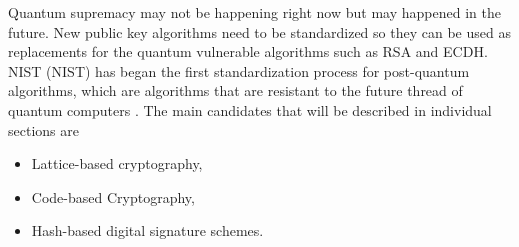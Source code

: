 Quantum supremacy may not be happening right now but may happened in the future. New public key algorithms need to be standardized so they can be used as replacements for the quantum vulnerable algorithms such as RSA and ECDH. NIST (\acl{NIST}) has began the first standardization process for post-quantum algorithms, which are algorithms that are resistant to the future thread of quantum computers \cite{Chen2016}. The main candidates that will be described  in individual sections are
\begin{itemize}
  \item Lattice-based cryptography,
  \item Code-based Cryptography,
  \item Hash-based digital signature schemes.
\end{itemize}
